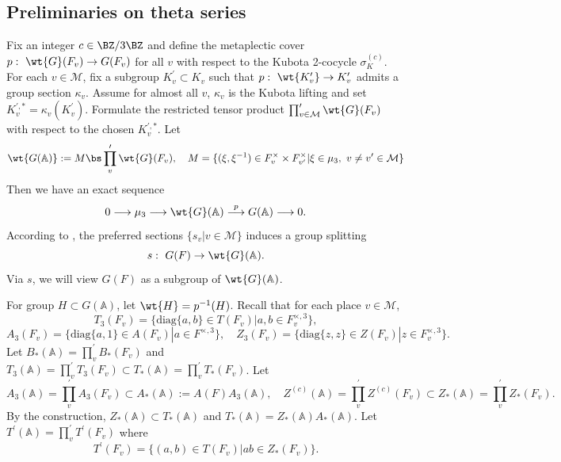 \documentclass[11pt,reqno]{amsart}
\newcommand{\BA}{{\mathbb {A}}} \newcommand{\BB}{{\mathbb {B}}}
\newcommand{\CM}{{\mathcal {M}}} \newcommand{\CN}{{\mathcal {N}}}
\newcommand{\diag}{{\mathrm{diag}}}
\newcommand{\lra}{\longrightarrow}\newcommand{\lla}{\longleftarrow}
\theoremstyle{plain}
\theoremstyle{remark} \newtheorem{remark}[thm]{Remark}
\theoremstyle{definition} \newtheorem{exercise}[thm]{Exercise}
\theoremstyle{definition} \newtheorem{example}[thm]{Example} \newtheorem{condition}[thm]{Condition}
\numberwithin{equation}{section}
\renewcommand{\-}{\text{--}}
\begin{document}
\subsection{Preliminaries on theta series}
Fix an integer $c\in\BZ/3\BZ$ and define the metaplectic cover  $p:\ \wt{G}(F_v)\to G(F_v)$ for all $v$ with respect to the Kubota 2-cocycle $\sigma_K^{(c)}$. 
For each $v\in\CM$, fix a  subgroup $K_v^{\prime}\subset K_v$ such that $p:\ \wt{K_v^\prime}\to K_v^\prime$ admits a group section $\kappa_v$. Assume for almost all $v$, $\kappa_v$ is the Kubota lifting and  set $K_v^{\prime,*}=\kappa_v(K_v^\prime)$.
Formulate the restricted tensor product $\prod_{v\in\CM}^\prime \wt{G}(F_v)$ with respect to the chosen $K_v^{\prime,*}$. Let \[\wt{G(\BA)}:= M\bs \prod_v^\prime \wt{G}(F_v),\quad M=\{(\xi,\xi^{-1})\in F_v^\times\times F_{v^\prime}^\times| \xi\in\mu_3,\ v\neq v^\prime\in \CM\}\]
Then we have an exact sequence 
\[0\lra\mu_3\lra\wt{G}(\BA)\stackrel{p}{\lra} G(\BA)\lra 0.\]
According to \cite[Section 0.II]{KP84}, the preferred sections $\{s_v|v\in\CM\}$ induces a group splitting 
\[s:\ G(F)\to \wt{G}(\BA).\] 
Via $s$, we will view $G(F)$ as a subgroup of $\wt{G}(\BA)$.

For group $H\subset G(\BA)$, let $\wt{H}=p^{-1}(H)$. Recall that for each place $v\in\CM$, 
\[T_3(F_v)=\{\diag\{a,b\}\in T(F_v)|a,b\in F_v^{\times,3}\},\]
\[ A_3(F_v)=\{\diag\{a,1\}\in A(F_v)|a\in F^{\times,3}\},\quad Z_3(F_v)=\{\diag\{z,z\}\in Z(F_v)|z\in F_v^{\times,3}\}.\]
Let $B_*(\BA)=\prod_v^\prime B_*(F_v)$ and $T_3(\BA)=\prod_v^\prime T_3(F_v)\subset T_*(\BA)=\prod^\prime_v T_*(F_v)$. Let 
\[A_3(\BA)=\prod^\prime_v A_3(F_v)\subset A_*(\BA):=A(F)A_3(\BA),\quad Z^{(c)}(\BA)=\prod_v^\prime Z^{(c)}(F_v)\subset Z_*(\BA)=\prod^\prime_v Z_{*}(F_v).\]  
By the construction, $Z_*(\BA)\subset T_*(\BA)$  and $T_*(\BA)=Z_*(\BA)A_*(\BA)$.   Let $T^\prime(\BA)=\prod_v^\prime T^\prime(F_v)$ where \[T^\prime(F_v)=\{(a,b)\in T(F_v)| ab\in Z_*(F_v)\}.\] 
\end{document}
